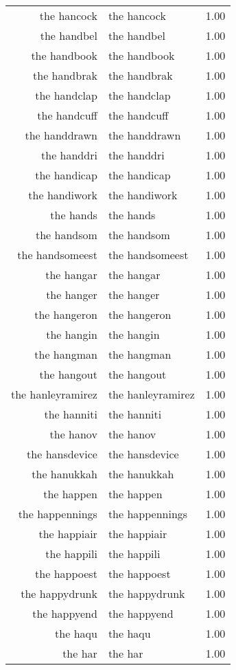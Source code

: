\begin{table}[ht]
\begin{tabular}{rlr}
  the hancock & the hancock & 1.00 \\ 
  the handbel & the handbel & 1.00 \\ 
  the handbook & the handbook & 1.00 \\ 
  the handbrak & the handbrak & 1.00 \\ 
  the handclap & the handclap & 1.00 \\ 
  the handcuff & the handcuff & 1.00 \\ 
  the handdrawn & the handdrawn & 1.00 \\ 
  the handdri & the handdri & 1.00 \\ 
  the handicap & the handicap & 1.00 \\ 
  the handiwork & the handiwork & 1.00 \\ 
  the hands & the hands & 1.00 \\ 
  the handsom & the handsom & 1.00 \\ 
  the handsomeest & the handsomeest & 1.00 \\ 
  the hangar & the hangar & 1.00 \\ 
  the hanger & the hanger & 1.00 \\ 
  the hangeron & the hangeron & 1.00 \\ 
  the hangin & the hangin & 1.00 \\ 
  the hangman & the hangman & 1.00 \\ 
  the hangout & the hangout & 1.00 \\ 
  the hanleyramirez & the hanleyramirez & 1.00 \\ 
  the hanniti & the hanniti & 1.00 \\ 
  the hanov & the hanov & 1.00 \\ 
  the hansdevice & the hansdevice & 1.00 \\ 
  the hanukkah & the hanukkah & 1.00 \\ 
  the happen & the happen & 1.00 \\ 
  the happennings & the happennings & 1.00 \\ 
  the happiair & the happiair & 1.00 \\ 
  the happili & the happili & 1.00 \\ 
  the happoest & the happoest & 1.00 \\ 
  the happydrunk & the happydrunk & 1.00 \\ 
  the happyend & the happyend & 1.00 \\ 
  the haqu & the haqu & 1.00 \\ 
  the har & the har & 1.00 \\ 

\end{tabular}
\end{table}
